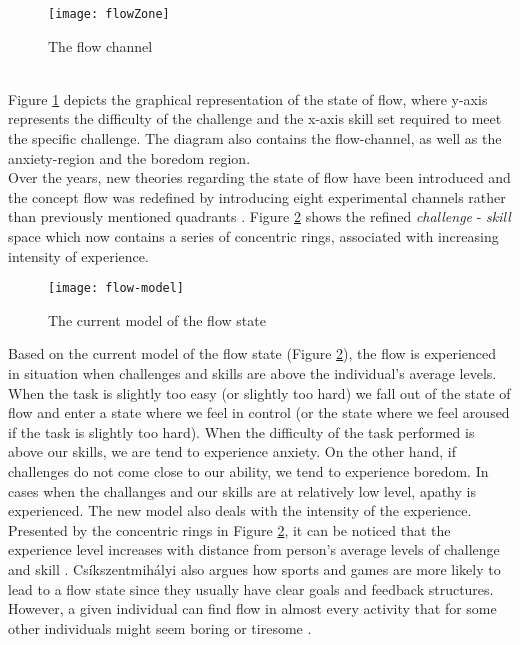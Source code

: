\begin{figure}[h]
    \centering
    \texttt{[image: flowZone]}
    \caption{The flow channel \cite{csikszentmihalyi1996flow}}
    \label{fig:flowZone}
\end{figure}\\
Figure \ref{fig:flowZone} depicts the graphical representation of the state of flow, where y-axis represents the difficulty of the challenge and the x-axis skill set required to meet the specific challenge. The diagram also contains the flow-channel, as well as the anxiety-region and the boredom region.\\
Over the years, new theories regarding the state of flow have been introduced and the concept flow was redefined by introducing eight experimental channels rather than previously mentioned quadrants \cite{nakamura2014concept}. Figure \ref{fig:flowModel} shows the refined \textit{challenge} - \textit{skill} space which now contains a series of concentric rings, associated with increasing intensity of experience.
\begin{figure}[h]
    \centering
    \texttt{[image: flow-model]}
    \caption{The current model of the flow state \cite{nakamura2014concept}}
    \label{fig:flowModel}
\end{figure}
Based on the current model of the flow state (Figure \ref{fig:flowModel}), the flow is experienced in situation when challenges and skills are above the individual's average levels. When the task is slightly too easy (or slightly too hard) we fall out of the state of flow and enter a state where we feel in control (or the state where we feel aroused if the task is slightly too hard). When the difficulty of the task performed is above our skills, we are tend to experience anxiety. On the other hand, if challenges do not come close to our ability, we tend to experience boredom. In cases when the challanges and our skills are at relatively low level, apathy is experienced. The new model also deals with the intensity of the experience. Presented by the concentric rings in Figure \ref{fig:flowModel}, it can be noticed that the experience level increases with distance from person's average levels of challenge and skill \cite{nakamura2014concept}. Cs\'{i}kszentmih\'{a}lyi also argues how sports and games are more likely to lead to a flow state since they usually have clear goals and feedback structures. However, a given individual can find flow in almost every activity that for some other individuals might seem boring or tiresome \cite{csikszentmihalyi2014flow}.
